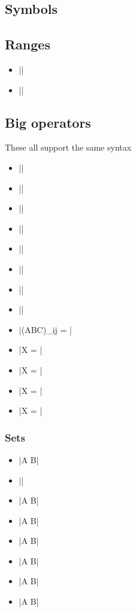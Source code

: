 \subsection{Symbols}

\subsection{Ranges}
\begin{itemize}
  \item \Example||
  \item \Example||
\end{itemize}

\subsection{Big operators}
These all support the same syntax
\begin{itemize}
  \item \Example||
  \item \Example||
  \item \Example||
  \item \Example||
  \item \Example||
  \item \Example||
  \item \Example||
  \item \Example||
  \item \Example|{(ABC)}_{ij} = |
  \item \Example|X = |
  \item \Example|X = |
  \item \Example|X = |
  \item \Example|X = |
\end{itemize}

\subsubsection{Sets}

\begin{itemize}
  \item \Example|A \setminus B|
  \item \Example|\emptyset|
  \item \Example|A \subset B|
  \item \Example|A \supset B|
  \item \Example|A \subseteq B|
  \item \Example|A \intersection B|
  \item \Example|A \union B|
  \item \Example|A \in B|
\end{itemize}


